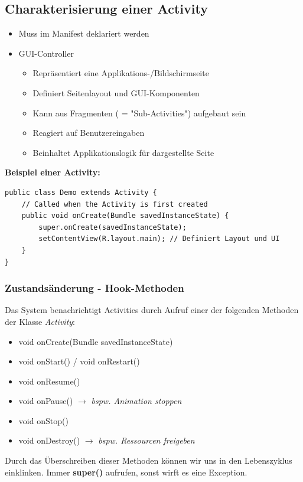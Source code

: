\documentclass[a4paper]{article}
\begin{document}
\subsection{Charakterisierung einer Activity}
\begin{itemize}
	\item Muss im Manifest deklariert werden
	\item GUI-Controller
	\begin{itemize}
		\item Repräsentiert eine Applikations-/Bildschirmseite
		\item Definiert Seitenlayout und GUI-Komponenten
		\item Kann aus Fragmenten ( = "Sub-Activities") aufgebaut sein
		\item Reagiert auf Benutzereingaben
		\item Beinhaltet Applikationslogik für dargestellte Seite
	\end{itemize}
\end{itemize}
\textbf{Beispiel einer Activity:}
\begin{lstlisting}
public class Demo extends Activity {
	// Called when the Activity is first created
	public void onCreate(Bundle savedInstanceState) {
		super.onCreate(savedInstanceState);
		setContentView(R.layout.main); // Definiert Layout und UI
	} 
}	
\end{lstlisting}
\subsubsection{Zustandsänderung - Hook-Methoden}
Das System benachrichtigt Activities durch Aufruf einer der folgenden Methoden der Klasse \textit{Activity}:
\begin{itemize}
	\item void onCreate(Bundle savedInstanceState)
	\item void onStart() / void onRestart()
	\item void onResume()
	\item void onPause() $\rightarrow$ \textit{bspw. Animation stoppen}
	\item void onStop()
	\item void onDestroy() $\rightarrow$ \textit{bspw. Ressourcen freigeben}
\end{itemize}
Durch das Überschreiben dieser Methoden können wir uns in den Lebenszyklus einklinken. Immer \textbf{super()} aufrufen, sonst wirft es eine Exception.
\newpage
\end{document}
